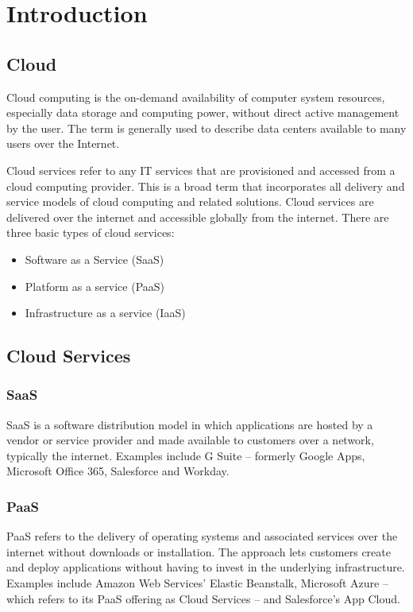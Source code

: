 \chapter{Introduction}
\hspace{3mm}

\section{Cloud}

Cloud computing is the on-demand availability of computer
system resources, especially data storage and computing power,
without direct active management by the user.
The term is generally used to describe data centers available
to many users over the Internet.

Cloud services refer to any IT services that are provisioned 
and accessed from a cloud computing provider. 
This is a broad term that incorporates all delivery and 
service models of cloud computing and related solutions. 
Cloud services are delivered over the internet and accessible globally from the internet. There are three basic types of cloud services:
\begin{itemize}
    \setlength\itemsep{-1em}
    \item Software as a Service (SaaS)
    \item Platform as a service (PaaS)
    \item Infrastructure as a service (IaaS)
\end{itemize}

\section{Cloud Services}

\subsection{SaaS}
SaaS is a software distribution model in which applications are hosted by a vendor or service provider and made available to customers over a network, typically the internet. Examples include G Suite -- formerly Google Apps, Microsoft Office 365, Salesforce and Workday.

\subsection{PaaS}
PaaS refers to the delivery of operating systems and associated services over the internet without downloads or installation. The approach lets customers create and deploy applications without having to invest in the underlying infrastructure. Examples include Amazon Web Services' Elastic Beanstalk, Microsoft Azure -- which refers to its PaaS offering as Cloud Services -- and Salesforce's App Cloud.

